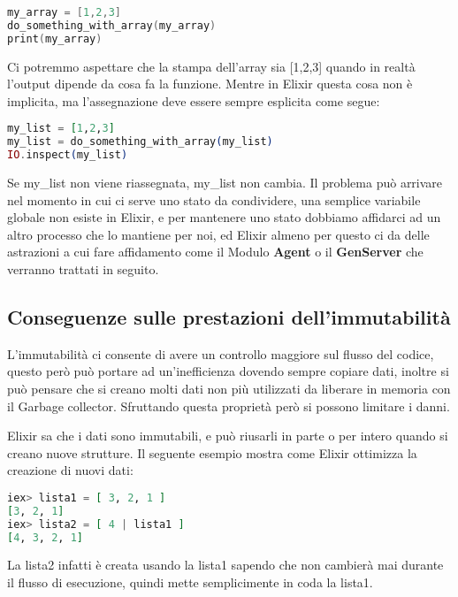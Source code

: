 \begin{lstlisting}[language=cpp]
my_array = [1,2,3]
do_something_with_array(my_array)
print(my_array)
\end{lstlisting}

Ci potremmo aspettare che la stampa dell'array sia [1,2,3] quando in realtà
l'output dipende da cosa fa la funzione. Mentre in Elixir questa cosa
non è implicita, ma l'assegnazione deve essere sempre esplicita come
segue:

\begin{lstlisting}[language=elixir]
my_list = [1,2,3]
my_list = do_something_with_array(my_list)
IO.inspect(my_list)
\end{lstlisting}

Se my\_list non viene riassegnata, my\_list non cambia.
Il problema può arrivare nel momento in cui ci serve uno stato
da condividere, una semplice variabile globale non esiste
in Elixir, e per mantenere uno stato dobbiamo
affidarci ad un altro processo che lo mantiene per noi,
ed Elixir almeno per questo ci da delle astrazioni
a cui fare affidamento come il Modulo \textbf{Agent} o il
\textbf{GenServer} che verranno trattati in seguito.

\subsection{Conseguenze sulle prestazioni dell'immutabilità}

L'immutabilità ci consente di avere un controllo maggiore
sul flusso del codice, questo però può portare ad un'inefficienza
dovendo sempre copiare dati, inoltre si può pensare che si creano
molti dati non più utilizzati da liberare in memoria con il Garbage collector.
Sfruttando questa proprietà però si possono limitare i danni.

Elixir sa che i dati sono immutabili, e può riusarli in parte o per
intero quando si creano nuove strutture.
Il seguente esempio mostra come Elixir ottimizza la creazione di
nuovi dati:

\begin{lstlisting}[language=elixir]
iex> lista1 = [ 3, 2, 1 ]
[3, 2, 1]
iex> lista2 = [ 4 | lista1 ]
[4, 3, 2, 1]
\end{lstlisting}

La lista2 infatti è creata usando la lista1 sapendo che non
cambierà mai durante il flusso di esecuzione, quindi mette
semplicimente in coda la lista1.

